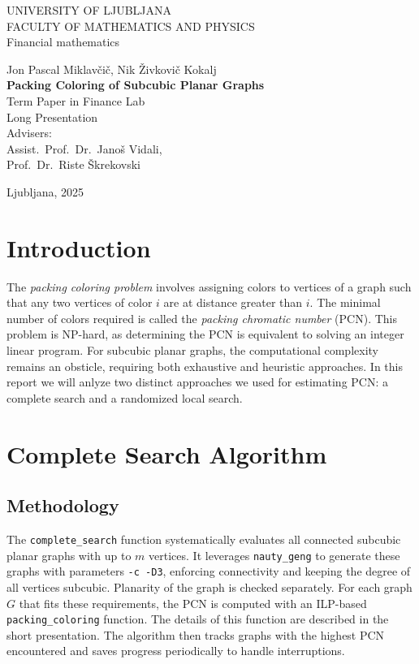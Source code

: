 \documentclass[12pt,a4paper]{amsart}
\theoremstyle{definition}
\theoremstyle{plain}
\newcommand{\program}{Financial mathematics}
\newcommand{\imeavtorja}{Jon Pascal Miklavčič, Nik Živkovič Kokalj}
\newcommand{\imementorja}{Assist.~Prof.~Dr.~Janoš Vidali}
\newcommand{\imesomentorja}{Prof.~Dr.~Riste Škrekovski}
\newcommand{\naslovdela}{Packing Coloring of Subcubic Planar Graphs}
\newcommand{\letnica}{2025}
\begin{document}
\thispagestyle{empty}
{\large
\noindent UNIVERSITY OF LJUBLJANA\\[1mm]
FACULTY OF MATHEMATICS AND PHYSICS\\[5mm]
\program\ }
\vfill

\begin{center}{\large
\imeavtorja\\[2mm]
{\bf \Large \naslovdela}\\[10mm]
{\normalsize Term Paper in Finance Lab}\\[1mm]
{\normalsize Long Presentation}\\[1cm]
{\normalsize Advisers:}\\
{\normalsize \imementorja, \\ \imesomentorja}\\[2mm]}
\end{center}
\vfill

{\large Ljubljana, \letnica}
\pagebreak

\section{Introduction}
The \emph{packing coloring problem} involves assigning colors to vertices of a graph such that any two vertices of 
color $i$ are at distance greater than $i$. The minimal number of colors required is called the 
\emph{packing chromatic number} (PCN). This problem is NP-hard, as determining the PCN is equivalent to solving an 
integer linear program. For subcubic planar graphs, the computational complexity remains an obsticle, requiring both 
exhaustive and heuristic approaches. In this report we will anlyze two distinct approaches we used for estimating PCN: 
a complete search and a randomized local search.

\section{Complete Search Algorithm}
\subsection{Methodology}
The \texttt{complete\_search} function systematically evaluates all connected subcubic planar graphs with up to $m$ vertices. 
It leverages \texttt{nauty\_geng} to generate these graphs with parameters \texttt{-c -D3}, enforcing connectivity and keeping 
the degree of all vertices subcubic. Planarity of the graph is checked separately. For each graph $G$ that fits these requirements, 
the PCN is computed with an ILP-based \texttt{packing\_coloring} function. The details of this function are described in the short 
presentation. The algorithm then tracks graphs with the highest PCN encountered and saves progress periodically to handle interruptions.
\end{document}

